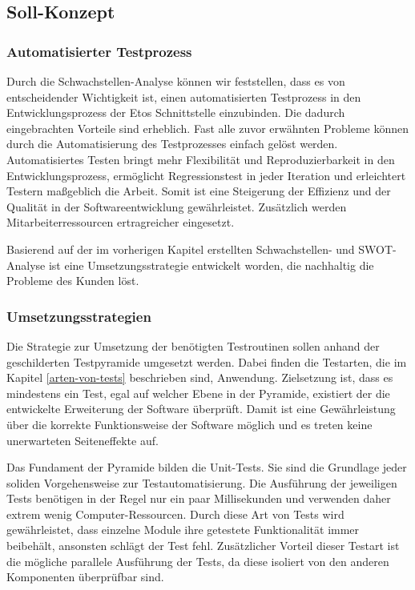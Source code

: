 \subsection{Soll-Konzept}\label{soll-konzept}
\subsubsection{Automatisierter Testprozess}
Durch die Schwachstellen-Analyse können wir feststellen, dass es von entscheidender Wichtigkeit ist, einen automatisierten Testprozess in den Entwicklungsprozess der Etos Schnittstelle einzubinden. Die dadurch eingebrachten Vorteile sind erheblich. Fast alle zuvor erwähnten Probleme können durch die Automatisierung des Testprozesses einfach gelöst werden. Automatisiertes Testen bringt mehr Flexibilität und Reproduzierbarkeit in den Entwicklungsprozess, ermöglicht Regressionstest in jeder Iteration und erleichtert Testern maßgeblich die Arbeit. Somit ist eine Steigerung der Effizienz und der Qualität in der Softwareentwicklung gewährleistet. Zusätzlich werden Mitarbeiterressourcen ertragreicher eingesetzt.

Basierend auf der im vorherigen Kapitel erstellten Schwachstellen- und SWOT-Analyse ist eine Umsetzungsstrategie entwickelt worden, die nachhaltig die Probleme des Kunden löst.

\subsubsection{Umsetzungsstrategien}
Die Strategie zur Umsetzung der benötigten Testroutinen sollen anhand der geschilderten Testpyramide umgesetzt werden. Dabei finden die Testarten, die im Kapitel \ref{arten-von-tests} beschrieben sind, Anwendung. Zielsetzung ist, dass es mindestens ein Test, egal auf welcher Ebene in der Pyramide, existiert der die entwickelte Erweiterung der Software überprüft. Damit ist eine Gewährleistung über die korrekte Funktionsweise der Software möglich und es treten keine unerwarteten Seiteneffekte auf.

Das Fundament der Pyramide bilden die Unit-Tests. Sie sind die Grundlage jeder soliden Vorgehensweise zur Testautomatisierung. Die Ausführung der jeweiligen Tests benötigen in der Regel nur ein paar Millisekunden und verwenden daher extrem wenig Computer-Ressourcen. Durch diese Art von Tests wird gewährleistet, dass einzelne Module ihre getestete Funktionalität immer beibehält, ansonsten schlägt der Test fehl. Zusätzlicher Vorteil dieser Testart ist die mögliche parallele Ausführung der Tests, da diese isoliert von den anderen Komponenten überprüfbar sind.

